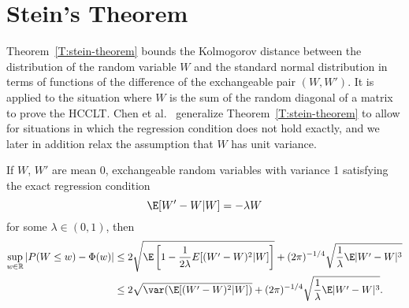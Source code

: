 \section{Stein's Theorem}
Theorem~\ref{T:stein-theorem} bounds the Kolmogorov distance between the
distribution of the random variable $W$ and the standard normal distribution
in terms of functions of the difference of the exchangeable pair $(W, W')$.  It is
applied to the situation where $W$ is the sum of the random diagonal of a matrix
to prove the HCCLT.  Chen et al.\ \cite{chen2010normal}
generalize Theorem~\ref{T:stein-theorem} to allow
for situations in which the regression condition does not hold exactly, and
we later in addition relax the assumption that $W$ has unit variance.
\begin{theorem}[Stein]\label{T:stein-theorem}
  If $W$, $W'$ are mean 0, exchangeable random variables with variance 1
  satisfying the exact regression condition
  \begin{equation*}
    \E[W'-W|W] = -\lambda W
  \end{equation*}
  for some $\lambda \in (0,1)$, then
  \begin{align*}
    \sup_{w \in \mathbb{R}} |P(W \leq w) - \Phi(w)| &\leq
    2\sqrt{\E \left [1 - \frac{1}{2 \lambda}E[(W'-W)^2|W] \right ]} +
    (2 \pi)^{-1/4}\sqrt{\frac{1}{\lambda}\E |W'-W|^3} \\
    &\leq 2 \sqrt{\var (\E [(W'-W)^2|W])} +
    (2 \pi)^{-1/4}\sqrt{\frac{1}{\lambda}\E |W'-W|^3}.
  \end{align*}
\end{theorem}


